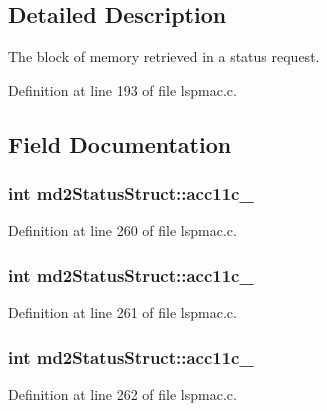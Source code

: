\subsection{Detailed Description}
The block of memory retrieved in a status request. 

Definition at line 193 of file lspmac.\-c.



\subsection{Field Documentation}
\hypertarget{structmd2StatusStruct_a69fc2e30a5de0a11c992d133e7a761cd}{
\subsubsection[{acc11c\-\_\-1}]{\setlength{\rightskip}{0pt plus 5cm}int md2\-Status\-Struct\-::acc11c\-\_}}\label{structmd2StatusStruct_a69fc2e30a5de0a11c992d133e7a761cd}


Definition at line 260 of file lspmac.\-c.

\hypertarget{structmd2StatusStruct_ad186f06cb4670b00b8af8264d1da66a4}{
\subsubsection[{acc11c\-\_\-2}]{\setlength{\rightskip}{0pt plus 5cm}int md2\-Status\-Struct\-::acc11c\-\_}}\label{structmd2StatusStruct_ad186f06cb4670b00b8af8264d1da66a4}


Definition at line 261 of file lspmac.\-c.

\hypertarget{structmd2StatusStruct_a20a15620e12888f61c0aed1e47e97932}{
\subsubsection[{acc11c\-\_\-3}]{\setlength{\rightskip}{0pt plus 5cm}int md2\-Status\-Struct\-::acc11c\-\_}}\label{structmd2StatusStruct_a20a15620e12888f61c0aed1e47e97932}


Definition at line 262 of file lspmac.\-c.

